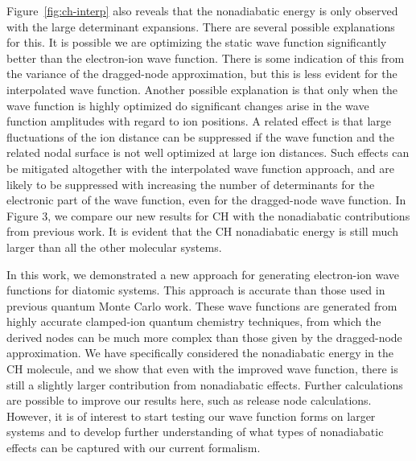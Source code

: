 Figure~\ref{fig:ch-interp} also reveals that the nonadiabatic energy is only observed with the
large determinant expansions. There are several possible explanations for this. It
is possible we are optimizing the static wave function significantly better than the
electron-ion wave function. There is some indication of this from the variance
of the dragged-node approximation, but this is less evident for the interpolated
wave function. Another possible explanation is that only when the wave function
is highly optimized do significant changes arise in the wave function amplitudes
with regard to ion positions. A related effect is that large fluctuations of the ion
distance can be suppressed if the wave function and the related nodal surface is
not well optimized at large ion distances. Such effects can be mitigated altogether
with the interpolated wave function approach, and are likely to be suppressed with
increasing the number of determinants for the electronic part of the wave function,
even for the dragged-node wave function. In Figure 3, we compare our new results
for CH with the nonadiabatic contributions from previous work. It is evident
that the CH nonadiabatic energy is still much larger than all the other molecular
systems.

In this work, we demonstrated a new approach for generating electron-ion
wave functions for diatomic systems. This approach is accurate than those used
in previous quantum Monte Carlo work. These wave functions are generated
from highly accurate clamped-ion quantum chemistry techniques, from which the
derived nodes can be much more complex than those given by the dragged-node
approximation. We have specifically considered the nonadiabatic energy in the CH
molecule, and we show that even with the improved wave function, there is still
a slightly larger contribution from nonadiabatic effects. Further calculations are
possible to improve our results here, such as release node calculations. However,
it is of interest to start testing our wave function forms on larger systems and
to develop further understanding of what types of nonadiabatic effects can be
captured with our current formalism.


